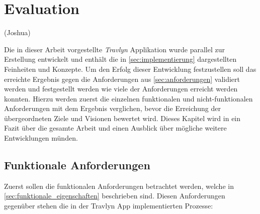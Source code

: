\chapter{Evaluation}

(Joshua)

Die in dieser Arbeit vorgestellte \textit{Travlyn} Applikation wurde parallel zur Erstellung entwickelt und enthält die in \autoref{sec:implementierung} dargestellten Feinheiten und Konzepte. Um den Erfolg dieser Entwicklung festzustellen soll das erreichte Ergebnis gegen die Anforderungen aus \autoref{sec:anforderungen} validiert werden und festgestellt werden wie viele der Anforderungen erreicht werden konnten. Hierzu werden zuerst die einzelnen funktionalen und nicht-funktionalen Anforderungen mit dem Ergebnis verglichen, bevor die Erreichung der übergeordneten Ziele und Visionen bewertet wird. Dieses Kapitel wird in ein Fazit über die gesamte Arbeit und einen Ausblick über mögliche weitere Entwicklungen münden.

\section{Funktionale Anforderungen}
Zuerst sollen die funktionalen Anforderungen betrachtet werden, welche in \autoref{sec:funktionale_eigenschaften} beschrieben sind. Diesen Anforderungen gegenüber stehen die in der Travlyn App implementierten Prozesse:

